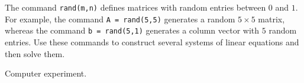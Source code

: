 \documentclass{ximera}
\begin{document}
\begin{exercise} \label{c2.1.6}
The \Matlab command {\tt rand(m,n)} defines
matrices with random
entries between $0$ and $1$.  For example, the command {\tt A =
rand(5,5)} generates a random $5\times 5$ matrix, whereas the
command {\tt b = rand(5,1)} generates a column vector with $5$
random entries.  Use these commands to construct several systems
of linear equations and then solve them.

\begin{solution}
Computer experiment.

\end{solution}
\end{exercise}
\end{document}
